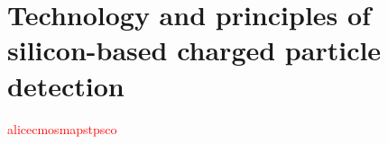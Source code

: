 %
\chapter{Technology and principles of silicon-based charged particle detection}
\label{chap:technology-and-principles}
%
\textcolor{red}{\blindtext}
\textcolor{red}{\gls{alice}\gls{cmos}\gls{maps}\gls{tpsco}}